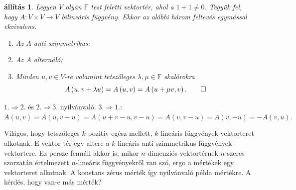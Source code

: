 \documentclass[a4paper, showtrims]{memoir}
\makeatletter
\renewenvironment{proof}[1][\proofname]
    {\par\pushQED{\qed}%
    \normalfont \topsep6\p@\@plus6\p@\relax
    \trivlist
    \item[\hskip\labelsep
        \itshape
    #1\@addpunct{:}]\ignorespaces}
    {\popQED\endtrivlist\@endpefalse}
\theoremstyle{plain}
\newtheorem{proposition}{állítás}[chapter]
\theoremstyle{remark}
\theoremstyle{definition}
\makeatother
\begin{document}
\begin{proposition}
	Legyen $V$ olyan $\mathbb{F}$ test feletti vektortér, ahol a $1+1\neq 0$.
	Tegyük fel, hogy
	$A:V\times V\rightarrow V$ bilineáris függvény.
	Ekkor az alábbi három feltevés egymással ekvivalens.
	\begin{enumerate}
		\item
		      Az $A$ anti-szimmetrikus;
		\item
		      Az $A$ alternáló;
		\item
		      Minden $u,v\in V$-re valamint tetszőleges $\lambda,\mu\in\mathbb{F}$ skalárokra
		      \[
			      A\left( u,v+\lambda u\right)
			      =
			      A\left( u,v\right)
			      =
			      A\left( u+\mu v,v\right).\qedhere
		      \]
	\end{enumerate}
\end{proposition}

\begin{proof}
	$1.\Rightarrow 2.$ és $2.\Rightarrow 3.$ nyilvánvaló.
	$3.\Rightarrow 1.$: $A\left( u,v\right) =A\left( u,v-u\right)
		=A\left( u+v-u,v-u\right) =A\left( v,v-u\right) =A\left( v,-u\right)
		=-A\left( v,u\right) .$
\end{proof}

Világos, hogy tetszőleges $k$ pozitív egész mellett, $k$-lineáris függvények vektorteret alkotnak.
E vektor tér egy altere a $k$-lineáris anti-szimmetrikus függvények vektortere.
Ez persze fennáll akkor is, mikor $n$-dimenziós vektortérnek $n$-szeres szorzatán értelmezett $n$-lineáris függvényekről van szó,
ergo a mértékek egy vektorteret alkotnak.
A konstans zérus mérték így nyilvánvaló példa mértékre.
A kérdés, hogy van-e más mérték?
\end{document}
